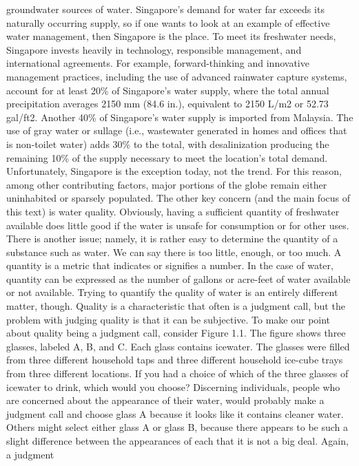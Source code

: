 \documentclass{article}
\begin{document}
groundwater sources of water. Singapore's demand for water far exceeds
its naturally occurring supply, so if one wants to look at an example of
effective water management, then Singapore is the place. To meet its
freshwater needs, Singapore invests heavily in technology, responsible
management, and international agreements. For example, forward-thinking
and innovative management practices, including the use of advanced
rainwater capture systems, account for at least 20\% of Singapore's
water supply, where the total annual precipitation averages 2150 mm
(84.6 in.), equivalent to 2150 L/m2 or 52.73 gal/ft2. Another 40\% of
Singapore's water supply is imported from Malaysia. The use of gray
water or sullage (i.e., wastewater generated in homes and offices that
is non-toilet water) adds 30\% to the total, with desalinization
producing the remaining 10\% of the supply necessary to meet the
location's total demand. Unfortunately, Singapore is the exception
today, not the trend. For this reason, among other contributing factors,
major portions of the globe remain either uninhabited or sparsely
populated. The other key concern (and the main focus of this text) is
water quality. Obviously, having a sufficient quantity of freshwater
available does little good if the water is unsafe for consumption or for
other uses. There is another issue; namely, it is rather easy to
determine the quantity of a substance such as water. We can say there is
too little, enough, or too much. A quantity is a metric that indicates
or signifies a number. In the case of water, quantity can be expressed
as the number of gallons or acre-feet of water available or not
available. Trying to quantify the quality of water is an entirely
different matter, though. Quality is a characteristic that often is a
judgment call, but the problem with judging quality is that it can be
subjective. To make our point about quality being a judgment call,
consider Figure 1.1. The figure shows three glasses, labeled A, B, and
C. Each glass contains icewater. The glasses were filled from three
different household taps and three different household ice-cube trays
from three different locations. If you had a choice of which of the
three glasses of icewater to drink, which would you choose? Discerning
individuals, people who are concerned about the appearance of their
water, would probably make a judgment call and choose glass A because it
looks like it contains cleaner water. Others might select either glass A
or glass B, because there appears to be such a slight difference between
the appearances of each that it is not a big deal. Again, a judgment
\end{document}
